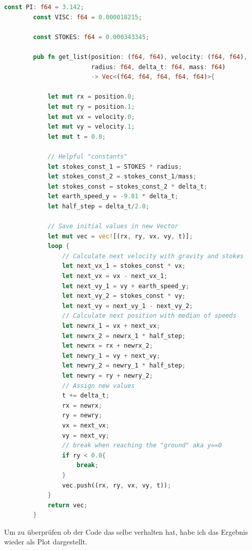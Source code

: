 \documentclass{article}
\begin{document}
    \begin{lstlisting}[language=Rust, caption={Optimierter Code.}, label=lst:Codeblock besser]
        const PI: f64 = 3.142;
        const VISC: f64 = 0.000018215;

        const STOKES: f64 = 0.000343345;

        pub fn get_list(position: (f64, f64), velocity: (f64, f64),
                        radius: f64, delta_t: f64, mass: f64)
                        -> Vec<(f64, f64, f64, f64, f64)>{

            let mut rx = position.0;
            let mut ry = position.1;
            let mut vx = velocity.0;
            let mut vy = velocity.1;
            let mut t = 0.0;

            // Helpful "constants"
            let stokes_const_1 = STOKES * radius;
            let stokes_const_2 = stokes_const_1/mass;
            let stokes_const = stokes_const_2 * delta_t;
            let earth_speed_y = -9.81 * delta_t;
            let half_step = delta_t/2.0;

            // Save initial values in new Vector
            let mut vec = vec![(rx, ry, vx, vy, t)];
            loop {
                // Calculate next velocity with gravity and stokes
                let next_vx_1 = stokes_const * vx;
                let next_vx = vx - next_vx_1;
                let next_vy_1 = vy + earth_speed_y;
                let next_vy_2 = stokes_const * vy;
                let next_vy = next_vy_1 - next_vy_2;
                // Calculate next position with median of speeds
                let newrx_1 = vx + next_vx;
                let newrx_2 = newrx_1 * half_step;
                let newrx = rx + newrx_2;
                let newry_1 = vy + next_vy;
                let newry_2 = newry_1 * half_step;
                let newry = ry + newry_2;
                // Assign new values
                t += delta_t;
                rx = newrx;
                ry = newry;
                vx = next_vx;
                vy = next_vy;
                // break when reaching the "ground" aka y==0
                if ry < 0.0{
                    break;
                }
                vec.push((rx, ry, vx, vy, t));
            }
            return vec;
        }
    \end{lstlisting}

    \newpage

    Um zu überprüfen ob der Code das selbe verhalten hat, habe ich das Ergebnis wieder als Plot dargestellt.
\end{document}
